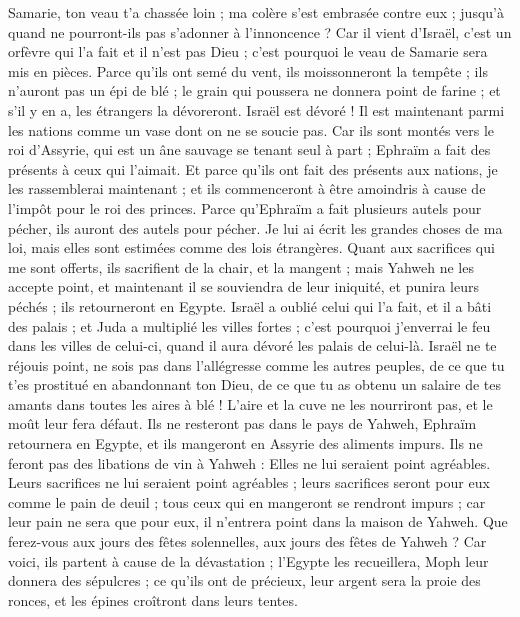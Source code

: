 \begin{multicols}{2}
Samarie, ton veau t'a chassée loin ; ma colère s'est embrasée contre eux ; jusqu'à quand ne pourront-ils pas s'adonner à l'innoncence ?
Car il vient d'Israël, c'est un orfèvre qui l'a fait et il n'est pas Dieu ; c'est pourquoi le veau de Samarie sera mis en pièces.
Parce qu'ils ont semé du vent, ils moissonneront la tempête ; ils n’auront pas un épi de blé ; le grain qui poussera ne donnera point de farine ; et s'il y en a, les étrangers la dévoreront.
Israël est dévoré ! Il est maintenant parmi les nations comme un vase dont on ne se soucie pas.
Car ils sont montés vers le roi d'Assyrie, qui est un âne sauvage se tenant seul à part ; Ephraïm a fait des présents à ceux qui l'aimait.
Et parce qu'ils ont fait des présents aux nations, je les rassemblerai maintenant ; et ils commenceront à être amoindris à cause de l'impôt pour le roi des princes.
Parce qu'Ephraïm a fait plusieurs autels pour pécher, ils auront des autels pour pécher.
Je lui ai écrit les grandes choses de ma loi, mais elles sont estimées comme des lois étrangères.
Quant aux sacrifices qui me sont offerts, ils sacrifient de la chair, et la mangent ; mais Yahweh ne les accepte point, et maintenant il se souviendra de leur iniquité, et punira leurs péchés ; ils retourneront en Egypte.
Israël a oublié celui qui l'a fait, et il a bâti des palais ; et Juda a multiplié les villes fortes ; c'est pourquoi j'enverrai le feu dans les villes de celui-ci, quand il aura dévoré les palais de celui-là.
\VerseOne{}Israël ne te réjouis point, ne sois pas dans l’allégresse comme les autres peuples, de ce que tu t’es prostitué en abandonnant ton Dieu, de ce que tu as obtenu un salaire de tes amants dans toutes les aires à blé !
L'aire et la cuve ne les nourriront pas, et le moût leur fera défaut.
Ils ne resteront pas dans le pays de Yahweh, Ephraïm retournera en Egypte, et ils mangeront en Assyrie des aliments impurs.
Ils ne feront pas des libations de vin à Yahweh : Elles ne lui seraient point agréables. Leurs sacrifices ne lui seraient point agréables ; leurs sacrifices seront pour eux comme le pain de deuil ; tous ceux qui en mangeront se rendront impurs ; car leur pain ne sera que pour eux, il n'entrera point dans la maison de Yahweh.
Que ferez-vous aux jours des fêtes solennelles, aux jours des fêtes de Yahweh ?
Car voici, ils partent à cause de la dévastation ; l'Egypte les recueillera, Moph leur donnera des sépulcres ; ce qu’ils ont de précieux, leur argent sera la proie des ronces, et les épines croîtront dans leurs tentes.

\end{multicols}
